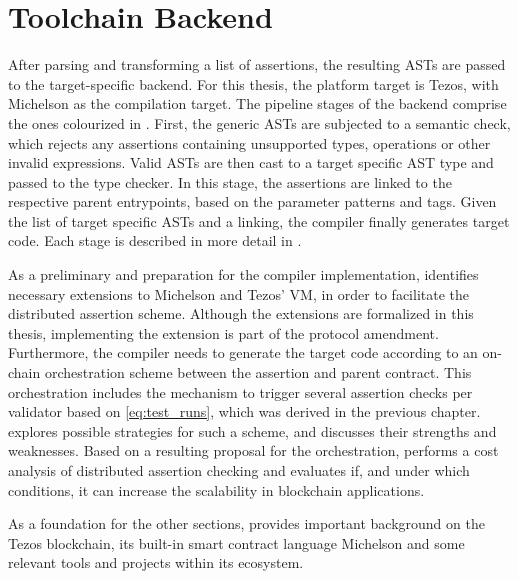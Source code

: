 \chapter{Toolchain Backend}\label{chap:offline_tezos}
After parsing and transforming a list of assertions, the resulting ASTs are passed to the target-specific backend. For this thesis, the platform target is Tezos, with Michelson as the compilation target. The pipeline stages of the backend comprise the ones colourized in . First, the generic ASTs are subjected to a semantic check, which rejects any assertions containing unsupported types, operations or other invalid expressions. Valid ASTs are then cast to a target specific AST type and passed to the type checker. In this stage, the assertions are linked to the respective parent entrypoints, based on the parameter patterns and tags. Given the list of target specific ASTs and a linking, the compiler finally generates target code. Each stage is described in more detail in .

As a preliminary and preparation for the compiler implementation,  identifies necessary extensions to Michelson and Tezos' VM, in order to facilitate the distributed assertion scheme. Although the extensions are formalized in this thesis, implementing the extension is part of the protocol amendment. Furthermore, the compiler needs to generate the target code according to an on-chain orchestration scheme between the assertion and parent contract. This orchestration includes the mechanism to trigger several assertion checks per validator based on \eqref{eq:test_runs}, which was derived in the previous chapter.  explores possible strategies for such a scheme, and discusses their strengths and weaknesses. Based on a resulting proposal for the orchestration,  performs a cost analysis of distributed assertion checking and evaluates if, and under which conditions, it can increase the scalability in blockchain applications.

As a foundation for the other sections,  provides important background on the Tezos blockchain, its built-in smart contract language Michelson and some relevant tools and projects within its ecosystem.

